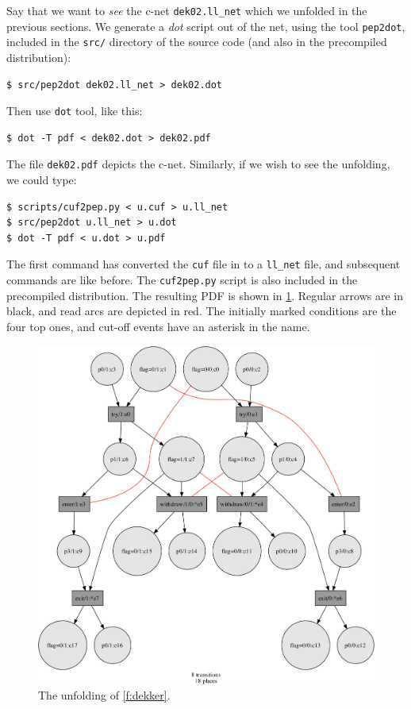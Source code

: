 \documentclass[a4paper]{refart}
\begin{document}
Say that we want to \textit{see} the c-net \verb!dek02.ll_net! which we
unfolded in the previous sections.
We generate a \textit{dot} script out of the net, using the tool
\verb!pep2dot!, included in the \verb!src/! directory of the source code
(and also in the precompiled distribution):
\begin{verbatim}
$ src/pep2dot dek02.ll_net > dek02.dot
\end{verbatim}
Then use \verb!dot! tool, like this:
\begin{verbatim}
$ dot -T pdf < dek02.dot > dek02.pdf
\end{verbatim}
The file \verb!dek02.pdf! depicts the c-net.
Similarly, if we wish to see the unfolding, we could type:
\begin{verbatim}
$ scripts/cuf2pep.py < u.cuf > u.ll_net
$ src/pep2dot u.ll_net > u.dot
$ dot -T pdf < u.dot > u.pdf
\end{verbatim}
The first command has converted the \verb!cuf! file in to a
\verb!ll_net! file, and subsequent commands are like before.
The \verb!cuf2pep.py! script is also included in the precompiled
distribution.
The resulting PDF is shown in \cref{f:dek02unf}.
Regular arrows are in black, and read arcs are depicted in red.
The initially marked conditions are the four top ones,
and cut-off events have an asterisk in the name.

\begin{figure}[bt]
\centering
\includegraphics[scale=0.25]{fig/dek02-unf.pdf}
\caption{The unfolding of \cref{f:dekker}.}
\label{f:dek02unf}
\end{figure}
\end{document}
